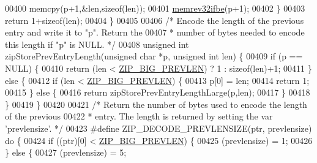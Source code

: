 \begin{DoxyCode}
{{00400         memcpy(p+1,&len,\textcolor{keyword}{sizeof}(len));
00401         \hyperlink{endianconv_8h_a771f3656eb7d11a1e7f7294b657d8978}{memrev32ifbe}(p+1);
00402     \}
00403     \textcolor{keywordflow}{return} 1+\textcolor{keyword}{sizeof}(len);
00404 \}
00405 
00406 \textcolor{comment}{/* Encode the length of the previous entry and write it to "p". Return the}
00407 \textcolor{comment}{ * number of bytes needed to encode this length if "p" is NULL. */}
00408 \textcolor{keywordtype}{unsigned} \textcolor{keywordtype}{int} zipStorePrevEntryLength(\textcolor{keywordtype}{unsigned} \textcolor{keywordtype}{char} *p, \textcolor{keywordtype}{unsigned} \textcolor{keywordtype}{int} len) \{
00409     \textcolor{keywordflow}{if} (p == NULL) \{
00410         \textcolor{keywordflow}{return} (len < \hyperlink{ziplist_8c_a71ab0a14d45281783972841212042df8}{ZIP\_BIG\_PREVLEN}) ? 1 : \textcolor{keyword}{sizeof}(len)+1;
00411     \} \textcolor{keywordflow}{else} \{
00412         \textcolor{keywordflow}{if} (len < \hyperlink{ziplist_8c_a71ab0a14d45281783972841212042df8}{ZIP\_BIG\_PREVLEN}) \{
00413             p[0] = len;
00414             \textcolor{keywordflow}{return} 1;
00415         \} \textcolor{keywordflow}{else} \{
00416             \textcolor{keywordflow}{return} zipStorePrevEntryLengthLarge(p,len);
00417         \}
00418     \}
00419 \}
00420 
00421 \textcolor{comment}{/* Return the number of bytes used to encode the length of the previous}
00422 \textcolor{comment}{ * entry. The length is returned by setting the var 'prevlensize'. */}
00423 \textcolor{preprocessor}{#}\textcolor{preprocessor}{define} \textcolor{preprocessor}{ZIP\_DECODE\_PREVLENSIZE}\textcolor{preprocessor}{(}\textcolor{preprocessor}{ptr}\textcolor{preprocessor}{,} \textcolor{preprocessor}{prevlensize}\textcolor{preprocessor}{)} \textcolor{keywordflow}{do} \textcolor{preprocessor}{\{}
00424     \textcolor{keywordflow}{if} \textcolor{preprocessor}{(}\textcolor{preprocessor}{(}\textcolor{preprocessor}{ptr}\textcolor{preprocessor}{)}\textcolor{preprocessor}{[}0\textcolor{preprocessor}{]} \textcolor{preprocessor}{<} \hyperlink{ziplist_8c_a71ab0a14d45281783972841212042df8}{ZIP\_BIG\_PREVLEN}\textcolor{preprocessor}{)} \textcolor{preprocessor}{\{}
00425         \textcolor{preprocessor}{(}\textcolor{preprocessor}{prevlensize}\textcolor{preprocessor}{)} \textcolor{preprocessor}{=} 1\textcolor{preprocessor}{;}
00426     \textcolor{preprocessor}{\}} \textcolor{keywordflow}{else} \textcolor{preprocessor}{\{}
00427         \textcolor{preprocessor}{(}\textcolor{preprocessor}{prevlensize}\textcolor{preprocessor}{)} \textcolor{preprocessor}{=} 5\textcolor{preprocessor}{;}
}}
\end{DoxyCode}
